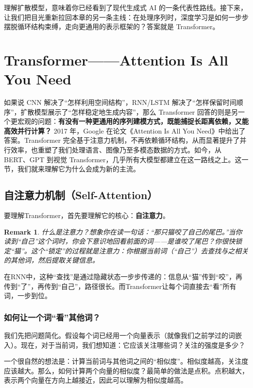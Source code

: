 \documentclass[lang=cn,zihao=-4,a4paper,fontset=windows]{beautybook}
\newtheorem*{remark}{\textbf{Remark}}
\begin{document}
理解扩散模型，意味着你已经看到了现代生成式 AI 的一条代表性路线。接下来，让我们把目光重新拉回本章的另一条主线：在处理序列时，深度学习是如何一步步摆脱循环结构束缚，走向更通用的表示框架的？答案就是 Transformer。

\section{Transformer——Attention Is All You Need}

如果说 CNN 解决了“怎样利用空间结构”，RNN/LSTM 解决了“怎样保留时间顺序”，扩散模型展示了“怎样稳定地生成内容”，那么 Transformer 回答的则是另一个更宏观的问题：\textbf{有没有一种更通用的序列建模方式，既能捕捉长距离依赖，又能高效并行计算？} 2017 年，Google 在论文《Attention Is All You Need》中给出了答案。Transformer 完全基于注意力机制，不再依赖循环结构，从而显著提升了并行效率，也重塑了我们处理语言、图像乃至多模态数据的方式。如今，从 BERT、GPT 到视觉 Transformer，几乎所有大模型都建立在这一路线之上。这一节，我们就来理解它为什么会成为新的主流。

\subsection{自注意力机制（Self-Attention）}

要理解Transformer，首先要理解它的核心：\textbf{自注意力}。
\begin{remark}
什么是注意力？想象你在读一句话：“那只猫咬了自己的尾巴。”当你读到“自己”这个词时，你会下意识地回看前面的词——是谁咬了尾巴？你很快锁定“猫”。这个“锁定”的过程就是注意力：你根据当前词（“自己”）去查找与之相关的其他词，然后提取关键信息。
\end{remark}
在RNN中，这种“查找”是通过隐藏状态一步步传递的：信息从“猫”传到“咬”，再传到“了”，再传到“自己”，路径很长。而Transformer让每个词直接去“看”所有词，一步到位。

\subsubsection*{如何让一个词“看”其他词？}

我们先把问题简化。假设每个词已经用一个向量表示（就像我们之前学过的词嵌入）。现在，对于当前词，我们想知道：它应该关注哪些词？关注的强度是多少？

一个很自然的想法是：计算当前词与其他词之间的“相似度”。相似度越高，关注度应该越大。那么，如何计算两个向量的相似度？最简单的做法是点积。点积越大，表示两个向量在方向上越接近，因此可以理解为相似度越高。
\end{document}
